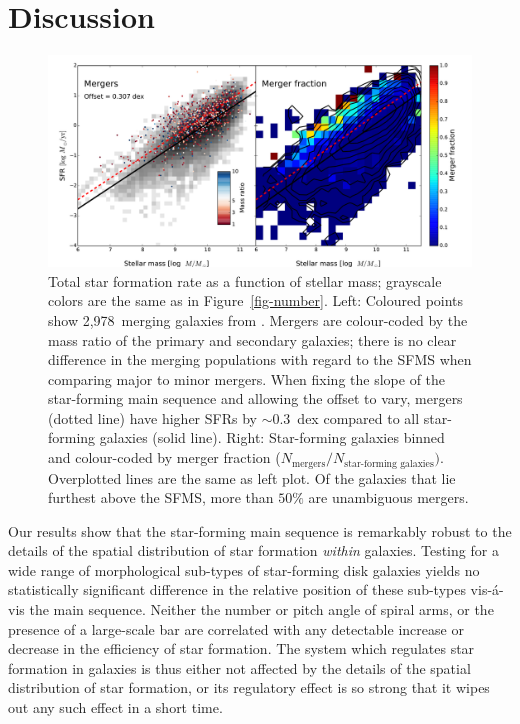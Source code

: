 \documentclass[useAMS,usenatbib]{mn2e}
\begin{document}
\section{Discussion}\label{sec-discussion}

\begin{figure}
\includegraphics[angle=0,width=7.0in]{figures/ms_mergers_both.pdf}
\caption{Total star formation rate as a function of stellar mass; grayscale colors are the same as in Figure~\ref{fig-number}. Left: Coloured points show 2,978~merging galaxies from \citet{dar10a}. Mergers are colour-coded by the mass ratio of the primary and secondary galaxies; there is no clear difference in the merging populations with regard to the SFMS when comparing major to minor mergers. When fixing the slope of the star-forming main sequence and allowing the offset to vary, mergers (dotted line) have higher SFRs by $\sim0.3$~dex compared to all star-forming galaxies (solid line). Right: Star-forming galaxies binned and colour-coded by merger fraction ($N_\textrm{mergers}/N_\textrm{star-forming galaxies})$. Overplotted lines are the same as left plot. Of the galaxies that lie furthest above the SFMS, more than $50\%$ are unambiguous mergers. 
\label{fig-mergers}}
\end{figure}

Our results show that the star-forming main sequence is remarkably robust to the details of the spatial distribution of star formation \textit{within} galaxies. Testing for a wide range of morphological sub-types of star-forming disk galaxies yields no statistically significant difference in the relative position of these sub-types vis-\'a-vis the main sequence. Neither the number or pitch angle of spiral arms, or the presence of a large-scale bar are correlated with any detectable increase or decrease in the efficiency of star formation. The system which regulates star formation in galaxies is thus either not affected by the details of the spatial distribution of star formation, or its regulatory effect is so strong that it wipes out any such effect in a short time. 
\end{document}
